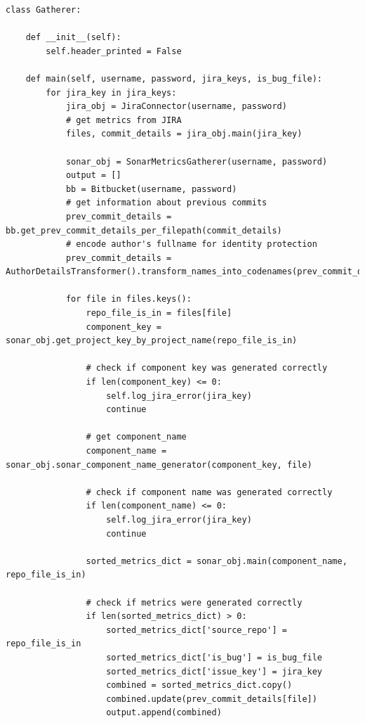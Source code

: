 \begin{landscape}

\begin{code}
\label{code:gatherer_main.py}
\begin{verbatim}
class Gatherer:

    def __init__(self):
        self.header_printed = False

    def main(self, username, password, jira_keys, is_bug_file):
        for jira_key in jira_keys:
            jira_obj = JiraConnector(username, password)
            # get metrics from JIRA
            files, commit_details = jira_obj.main(jira_key)

            sonar_obj = SonarMetricsGatherer(username, password)
            output = []
            bb = Bitbucket(username, password)
            # get information about previous commits
            prev_commit_details = bb.get_prev_commit_details_per_filepath(commit_details)
            # encode author's fullname for identity protection
            prev_commit_details = AuthorDetailsTransformer().transform_names_into_codenames(prev_commit_details)

            for file in files.keys():
                repo_file_is_in = files[file]
                component_key = sonar_obj.get_project_key_by_project_name(repo_file_is_in)

                # check if component key was generated correctly
                if len(component_key) <= 0:
                    self.log_jira_error(jira_key)
                    continue

                # get component_name
                component_name = sonar_obj.sonar_component_name_generator(component_key, file)
               
                # check if component name was generated correctly
                if len(component_name) <= 0:
                    self.log_jira_error(jira_key)
                    continue

                sorted_metrics_dict = sonar_obj.main(component_name, repo_file_is_in)
               
                # check if metrics were generated correctly
                if len(sorted_metrics_dict) > 0:
                    sorted_metrics_dict['source_repo'] = repo_file_is_in
                    sorted_metrics_dict['is_bug'] = is_bug_file
                    sorted_metrics_dict['issue_key'] = jira_key
                    combined = sorted_metrics_dict.copy()
                    combined.update(prev_commit_details[file])
                    output.append(combined)


\end{verbatim}
\end{code}
\end{landscape}
